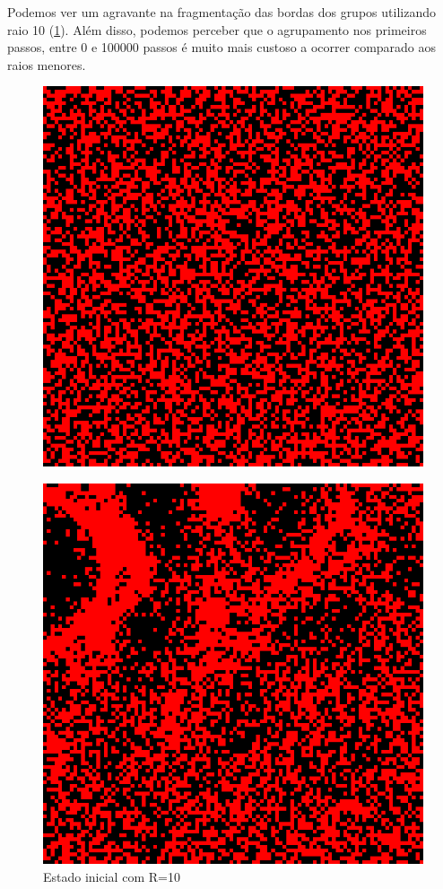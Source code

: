 \documentclass[conference]{IEEEtran}
\begin{document}
Podemos ver um agravante na fragmentação das bordas dos grupos utilizando raio 10 (\ref{fig:r10}). Além disso, podemos perceber que o agrupamento nos primeiros passos, entre 0 e 100000 passos é muito mais custoso a ocorrer comparado aos raios menores.


\begin{figure}[h!]
  \begin{minipage}[b]{0.5\linewidth}
    \label{fig:r10}
    \centering
    \includegraphics[width=.8\linewidth]{resultados/10-0.png}
    \caption{Estado inicial com R=10}
    \vspace{4ex}
  \end{minipage}%
  \begin{minipage}[b]{0.5\linewidth}
    \centering
    \includegraphics[width=.8\linewidth]{resultados/10-1.png}

\end{minipage}
\end{figure}
\end{document}
